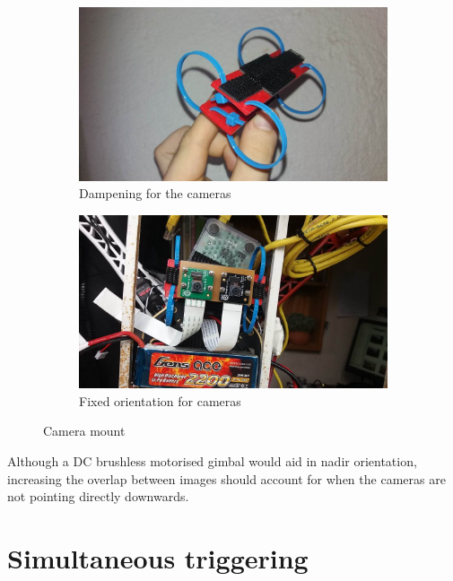 \begin{figure}[H]
\begin{subfigure}{0.5\textwidth}
\centering
\includegraphics[scale=0.3]{images/dampener.jpg}
\caption{Dampening for the cameras}
\label{fig:dampener}
\end{subfigure}
\begin{subfigure}{0.5\textwidth}
\centering
\includegraphics[scale=0.3]{images/fixed_orientation.jpg}
\caption{Fixed orientation for cameras}
\label{fig:fixed_orientation}
\end{subfigure}
\caption{Camera mount}
\label{fig:cam_mount}
\end{figure}

Although a DC brushless motorised gimbal would aid in nadir orientation, increasing the overlap between images should account for when the cameras are not pointing directly downwards.

\section{Simultaneous triggering}

